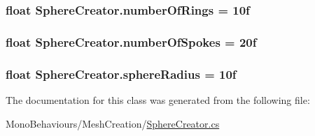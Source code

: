 \subsubsection[{\texorpdfstring{number\+Of\+Rings}{numberOfRings}}]{\setlength{\rightskip}{0pt plus 5cm}float Sphere\+Creator.\+number\+Of\+Rings = 10f}\hypertarget{class_sphere_creator_ac1f1879b99a5529f1d13027a8dcf858b}{}\label{class_sphere_creator_ac1f1879b99a5529f1d13027a8dcf858b}
\subsubsection[{\texorpdfstring{number\+Of\+Spokes}{numberOfSpokes}}]{\setlength{\rightskip}{0pt plus 5cm}float Sphere\+Creator.\+number\+Of\+Spokes = 20f}\hypertarget{class_sphere_creator_abddf892d90e8f5f7a3f2af72c4e559ee}{}\label{class_sphere_creator_abddf892d90e8f5f7a3f2af72c4e559ee}
\subsubsection[{\texorpdfstring{sphere\+Radius}{sphereRadius}}]{\setlength{\rightskip}{0pt plus 5cm}float Sphere\+Creator.\+sphere\+Radius = 10f}\hypertarget{class_sphere_creator_ae4838acd3e643148f4d0810c399f12d0}{}\label{class_sphere_creator_ae4838acd3e643148f4d0810c399f12d0}


The documentation for this class was generated from the following file\+:\begin{DoxyCompactItemize}
\item 
Mono\+Behaviours/\+Mesh\+Creation/\hyperlink{_sphere_creator_8cs}{Sphere\+Creator.\+cs}\end{DoxyCompactItemize}
